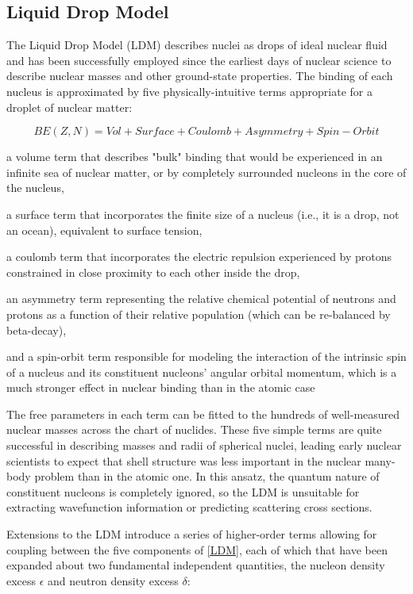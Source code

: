 \subsection{Liquid Drop Model}

The Liquid Drop Model (LDM) describes nuclei as drops of ideal nuclear fluid and
has been successfully employed since the earliest days of nuclear science to
describe nuclear masses and other ground-state properties. The binding of each
nucleus is approximated by five physically-intuitive terms appropriate for
a droplet of nuclear matter:

\begin{equation} \label{LDM}
    BE(Z, N) = Vol + Surface + Coulomb + Asymmetry + Spin-Orbit
\end{equation}

a volume term that describes "bulk" binding that would be experienced in an
infinite sea of nuclear matter, or by completely surrounded nucleons in the core of the nucleus,

a surface term that incorporates the finite size of a nucleus (i.e., it is a
drop, not an ocean), equivalent to surface tension,

a coulomb term that incorporates the electric repulsion experienced by protons
constrained in close proximity to each other inside the drop,

an asymmetry term representing the relative chemical potential of neutrons and
protons as a function of their relative population (which can be re-balanced by
beta-decay),

and a spin-orbit term responsible for modeling the interaction of the intrinsic spin
of a nucleus and its constituent nucleons' angular orbital momentum, which is
a much stronger effect in nuclear binding than in the atomic case

The free parameters in each term can be fitted to the hundreds of well-measured nuclear masses
across the chart of nuclides. These five simple terms are quite successful
in describing masses and radii of spherical nuclei, leading early nuclear
scientists to expect that shell structure was less important in the nuclear
many-body problem than in the atomic one. In this ansatz, the quantum
nature of constituent nucleons is completely ignored, so the LDM is  
unsuitable for extracting wavefunction information or predicting scattering
cross sections.

Extensions to the LDM introduce a series of higher-order terms allowing for coupling
between the five components of \ref{LDM}, each of which that have been expanded about two
fundamental independent quantities, the nucleon density excess $\epsilon$
and neutron density excess $\delta$:

